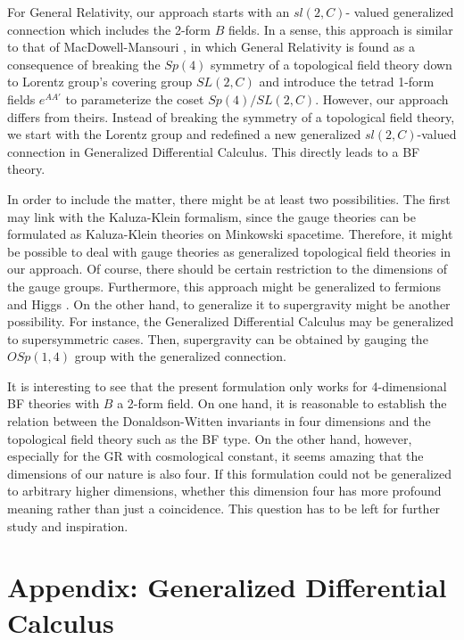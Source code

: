 \documentclass[a4paper,twocolumn,showpacs,prd]{revtex4}
\begin{document}
%
For General Relativity, our approach starts with an $sl(2,C)$-
valued generalized connection which includes the 2-form $B$
fields. In a sense, this approach is similar to that of
MacDowell-Mansouri \cite{MM}, in which General Relativity is found
as a consequence of breaking the $Sp(4)$ symmetry of a topological
field theory down to Lorentz group's covering group $SL(2,C)$ and
introduce the tetrad 1-form fields $e^{AA'}$ to parameterize the
coset $Sp(4)/SL(2,C)$. However, our approach differs from theirs.
Instead of breaking the symmetry of a topological field theory, we
start with the Lorentz group and redefined a new generalized
$sl(2,C)$-valued connection in Generalized Differential Calculus.
This directly leads to a BF theory.

In order to include the matter, there might be at least two
possibilities. The first may link with the Kaluza-Klein formalism,
since the gauge theories can be formulated as Kaluza-Klein
theories on Minkowski spacetime. Therefore,  it might be possible
to deal with gauge theories as generalized topological field
theories in our approach. Of course, there should be certain
restriction to the dimensions of the gauge groups. Furthermore,
this approach might be generalized to fermions and Higgs
\cite{liu}. On the other hand, to generalize it to supergravity
might be another possibility. For instance, the Generalized
Differential Calculus may be generalized to supersymmetric cases.
Then, supergravity can be obtained by gauging the $OSp(1,4)$ group
with the generalized connection.

It is interesting to see that the present formulation only works
for 4-dimensional BF theories with $B$ a 2-form field. On one
hand, it is reasonable to establish the relation between the
Donaldson-Witten invariants in four dimensions and the topological
field theory such as the BF type. On the other hand, however,
especially for the GR with cosmological constant, it seems amazing
that the dimensions of our nature is also four. If this
formulation could not be generalized to arbitrary higher
dimensions, whether  this dimension four has more profound meaning
rather than just a coincidence. This question has to be left for
further study and inspiration.

\section*{Appendix: Generalized Differential Calculus}
\end{document}
